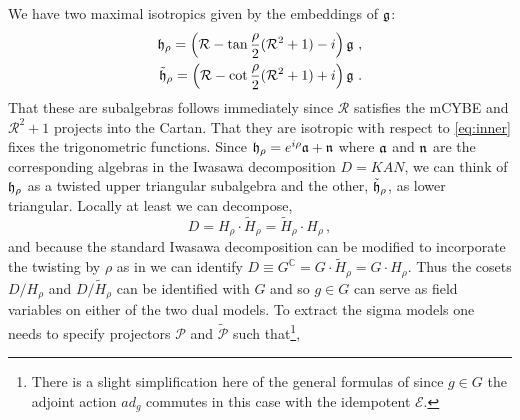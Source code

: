 \documentclass[12pt]{article}
\def\ee{\boldsymbol{e}}
\def\R{{\mathbb R}}
\def\be{\begin{equation}}
\def\ee{\end{equation}}
\renewcommand{\R}{\mathcal{R}}
\begin{document}
  We have two maximal isotropics given by the embeddings of $\frak{g}$:
  \be
  \begin{aligned}
  \frak{h}_\rho = \left(\R- \tan\frac{\rho}{2}( \R^2 + 1) - i  \right)\frak{g} \ ,  \\ 
  \tilde{  \frak{h}}_\rho = \left(\R-\cot\frac{\rho}{2}( \R^2 + 1) + i  \right)\frak{g}  \ . 
  \end{aligned}
  \ee
  That these are subalgebras follows immediately since  $\R$ satisfies the mCYBE and  $\R^2 + 1 $ projects  into the Cartan. That they are isotropic with respect to \eqref{eq:inner}  fixes the trigonometric functions.  Since $ \frak{h}_\rho = e^{i\rho}\frak{a}+\frak{n} $ where $\frak{a}$ and $\frak{n}$ are the corresponding algebras in the Iwasawa decomposition $D= KAN$,  we can think of $\frak{h}_\rho$ as a twisted upper triangular subalgebra and the other,    $\tilde{  \frak{h}}_\rho$, as  lower triangular. 
   Locally at least we can decompose, 
   \be
   D= H_\rho \cdot \tilde{H}_\rho    =   \tilde{H}_\rho \cdot H_\rho\, ,
   \ee    
   and because the standard Iwasawa decomposition can be modified to incorporate the twisting by $\rho$ as in     \cite{Klimcik:2017ken}  we can   identify $D \equiv G^{\mathbb{C}} =  G  \cdot \tilde{H}_\rho  = G  \cdot  H_\rho$.  Thus the cosets $D/H_\rho$ and $D/\tilde{H}_\rho$ can be identified with  $G$  and so $g\in G$ can serve as field variables on either of the two dual models.  To extract the sigma models one needs to specify projectors ${\mathcal P}$ and $\tilde{{\mathcal P}}$ such that\footnote{There is a slight simplification here of the general formulas of  \cite{Klimcik:2017ken}  since  $g \in G$ the adjoint action $ad_g$ commutes in this case with the idempotent ${\mathcal E}$.}, 
\end{document}
